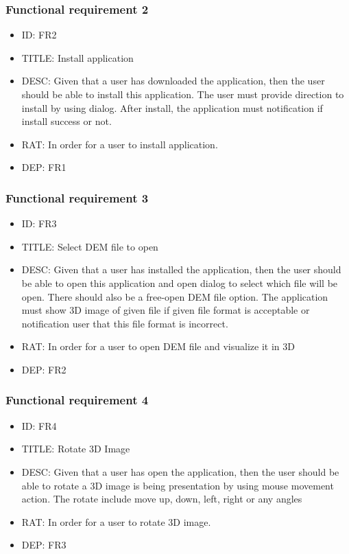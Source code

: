 \documentclass[11pt]{article}
\begin{document}
\subsubsection{Functional requirement 2}
\begin{itemize}
\item ID: FR2
\item TITLE: Install application
\item DESC: Given that a user has downloaded the application, then the user should be able to install this application. The user must provide direction to install by using dialog. After install, the application must notification if install success or not.
\item RAT: In order for a user to install application.
\item DEP: FR1
\end{itemize}
\subsubsection{Functional requirement 3}
\begin{itemize}
\item ID: FR3
\item TITLE: Select DEM file to open
\item DESC: Given that a user has installed the application, then the user should be able to open this application and open dialog to select which file will be open. There should also be a free-open DEM file option. The application must show 3D image of given file if given file format is acceptable or notification user that this file format is incorrect.
\item RAT: In order for a user to open DEM file and visualize it in 3D
\item DEP: FR2
\end{itemize}
\subsubsection{Functional requirement 4}
\begin{itemize}
\item ID: FR4
\item TITLE: Rotate 3D Image
\item DESC: Given that a user has open the application, then the user should be able to rotate a 3D image is being presentation by using mouse movement action. The rotate include move up, down, left, right or any angles
\item RAT: In order for a user to rotate 3D image.
\item DEP: FR3
\end{itemize}
\end{document}
